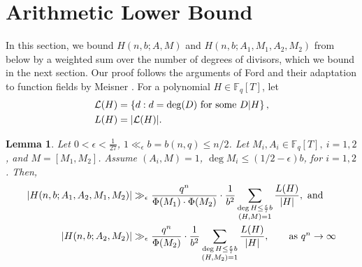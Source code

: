 \documentclass[12pt]{amsart}
\numberwithin{equation}{section}
\newtheorem{lemma}[theorem]{Lemma}
\theoremstyle{definition}
\theoremstyle{remark}
\newcommand{\FF}{\mathbb{F}}
\begin{document}
\section{Arithmetic Lower Bound} \label{sec:arithmetic_lb}

In this section, we bound $H(n,b;A,M)$ and $H(n,b;A_1,M_1,A_2,M_2)$ from below by a weighted sum over the number of degrees of divisors, which we bound in the next section. Our proof follows the arguments of Ford \cite{ford_H_y_2y} and their adaptation to function fields by Meisner \cite{Meisner_MT}. 
For a polynomial $H\in\mathbb{F}_q[T]$, let
\begin{align*}
    \mathcal{L}(H) &= \left\{d:d=\deg(D) \textnormal{ for some } D|H\right\}, \\
    L(H) &= |\mathcal{L}(H)|.
\end{align*}

\begin{lemma}\label{lm:main_lower_bound}
    Let $0<\epsilon<\frac{1}{27}$, $1 \ll_{\epsilon} b=b(n,q)\leq n/2$. Let $M_i, A_i\in \FF_q[T],\ i=1,2$, and $M = [M_1,M_2]$.  Assume $(A_i,M)=1$, $\deg M_i \leq (1/2-\epsilon) b$, for $i=1,2$. Then,
    \begin{align*}
        |H(n,b;A_1,A_2,M_1,M_2)| &\gg_{\epsilon} \frac{q^{n}}{\Phi(M_1)\cdot\Phi(M_2)} \cdot \frac{1}{b^2} \sum_{\substack{\deg H \leq \frac{\epsilon}{7} b \\ (H,M)=1}}  \frac{L(H)}{|H|}, \textnormal{ and }\\
        |H(n,b;A_2,M_2)| &\gg_{\epsilon} \frac{q^{n}}{\Phi(M_2)} \cdot \frac{1}{b^2} \sum_{\substack{\deg H\leq \frac{\epsilon}{7} b \\ (H,M_2)=1}}  \frac{L(H)}{|H|}, \qquad \mbox{as $q^n\to \infty$}
    \end{align*}
\end{lemma}
\end{document}
